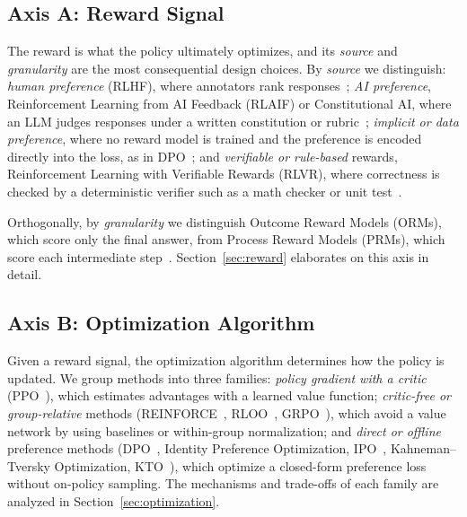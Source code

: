 \subsection{Axis A: Reward Signal}

The reward is what the policy ultimately optimizes, and its
\emph{source} and \emph{granularity} are the most consequential design
choices. By \emph{source} we distinguish: \emph{human preference}
(RLHF), where annotators rank
responses~\cite{christiano2017deeprl,ouyang2022instructgpt};
\emph{AI preference}, Reinforcement Learning from AI Feedback
(RLAIF) or Constitutional AI, where an LLM judges responses under a
written constitution or rubric~\cite{bai2022constitutional,lee2023rlaif};
\emph{implicit or data preference}, where no reward model is trained and
the preference is encoded directly into the loss, as in
DPO~\cite{rafailov2023dpo}; and \emph{verifiable or rule-based} rewards,
Reinforcement Learning with Verifiable Rewards (RLVR), where correctness
is checked by a deterministic verifier such as a math checker or unit
test~\cite{shao2024deepseekmath,guo2025deepseekr1}.

Orthogonally, by \emph{granularity} we distinguish Outcome Reward
Models (ORMs), which score only the final answer, from Process Reward
Models (PRMs), which score each intermediate
step~\cite{lightman2023verify}. Section~\ref{sec:reward} elaborates on
this axis in detail.

\subsection{Axis B: Optimization Algorithm}

Given a reward signal, the optimization algorithm determines how the
policy is updated. We group methods into three families:
\emph{policy gradient with a critic}
(PPO~\cite{schulman2017ppo}), which estimates advantages with a learned
value function; \emph{critic-free or group-relative} methods
(REINFORCE~\cite{williams1992reinforce}, RLOO~\cite{ahmadian2024rloo},
GRPO~\cite{shao2024deepseekmath}), which avoid a value network by using
baselines or within-group normalization; and \emph{direct or offline}
preference methods (DPO~\cite{rafailov2023dpo}, Identity Preference
Optimization, IPO~\cite{azar2024ipo}, Kahneman--Tversky Optimization,
KTO~\cite{ethayarajh2024kto}), which optimize a closed-form preference
loss without on-policy sampling. The mechanisms and trade-offs of each
family are analyzed in Section~\ref{sec:optimization}.

